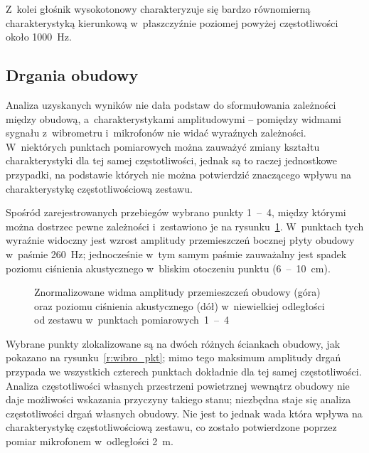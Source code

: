 \documentclass[12pt]{oska}
\newcommand{\range}[2]{\num{#1}~--~\num{#2}}
\begin{document}
	Z~kolei głośnik wysokotonowy charakteryzuje się bardzo równomierną charakterystyką kierunkową w~płaszczyźnie poziomej powyżej częstotliwości około \SI{1000}{Hz}.
	
	
	
	\subsection{Drgania obudowy}
	
	Analiza uzyskanych wyników nie dała podstaw do sformułowania zależności między obudową, a~charakterystykami amplitudowymi -- pomiędzy widmami sygnału z~wibrometru i~mikrofonów nie widać wyraźnych zależności. W~niektórych punktach pomiarowych można zauważyć zmiany kształtu charakterystyki dla tej samej częstotliwości, jednak są to raczej jednostkowe przypadki, na podstawie których nie można potwierdzić znaczącego wpływu na charakterystykę częstotliwościową zestawu.
	
	Spośród zarejestrowanych przebiegów wybrano punkty \range{1}{4}, między którymi można dostrzec pewne zależności i~zestawiono je na rysunku~\ref{r:wibrometr_1-4}. W~punktach tych wyraźnie widoczny jest wzrost amplitudy przemieszczeń bocznej płyty obudowy w~paśmie \SI{260}{\hertz}; jednocześnie w~tym samym paśmie zauważalny jest spadek poziomu ciśnienia akustycznego w~bliskim otoczeniu punktu (\range{6}{10}~\si{\cm}).
	
	\begin{figure}[!ht]
		\centering
		\caption{Znormalizowane widma amplitudy przemieszczeń obudowy (góra) oraz poziomu ciśnienia akustycznego (dół) w~niewielkiej odległości od zestawu w~punktach pomiarowych~\range{1}{4}}
		\label{r:wibrometr_1-4}
	\end{figure}
	
	Wybrane punkty zlokalizowane są na dwóch różnych ściankach obudowy, jak pokazano na rysunku~\ref{r:wibro_pkt}; mimo tego maksimum amplitudy drgań przypada we wszystkich czterech punktach dokładnie dla tej samej częstotliwości. Analiza częstotliwości własnych przestrzeni powietrznej wewnątrz obudowy nie daje możliwości wskazania przyczyny takiego stanu; niezbędna staje się analiza częstotliwości drgań własnych obudowy. Nie jest to jednak wada która wpływa na charakterystykę częstotliwościową zestawu, co zostało potwierdzone poprzez pomiar mikrofonem w~odległości \SI{2}{\metre}.
	
\end{document}
